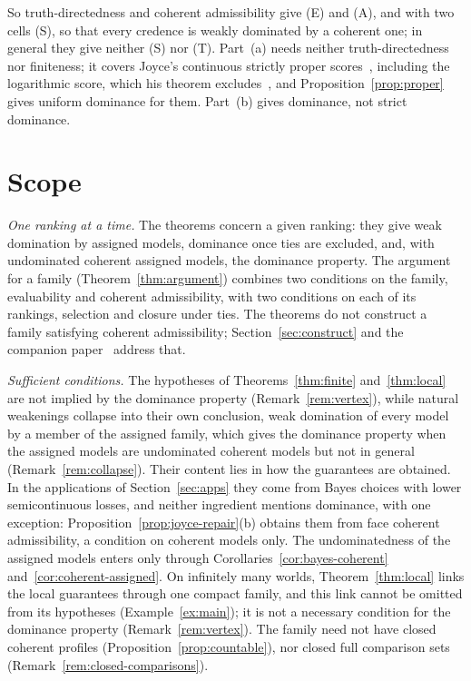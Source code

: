 \documentclass[11pt]{article}
\theoremstyle{definition}
\theoremstyle{remark}
\begin{document}
So truth-directedness and coherent admissibility give (E) and (A), and with two cells (S), so that every credence is weakly dominated by a coherent one; in general they give neither (S) nor (T). Part~(a) needs neither truth-directedness nor finiteness; it covers Joyce's continuous strictly proper scores~\cite[p.~276]{Joyce}, including the logarithmic score, which his theorem excludes~\cite[p.~288]{Joyce}, and Proposition~\ref{prop:proper} gives uniform dominance for them. Part~(b) gives dominance, not strict dominance.

\section{Scope}\label{sec:scope}
\emph{One ranking at a time.} The theorems concern a given ranking: they give weak domination by assigned models, dominance once ties are excluded, and, with undominated coherent assigned models, the dominance property. The argument for a family (Theorem~\ref{thm:argument}) combines two conditions on the family, evaluability and coherent admissibility, with two conditions on each of its rankings, selection and closure under ties. The theorems do not construct a family satisfying coherent admissibility; Section~\ref{sec:construct} and the companion paper~\cite{KCM} address that.

\emph{Sufficient conditions.} The hypotheses of Theorems~\ref{thm:finite} and~\ref{thm:local} are not implied by the dominance property (Remark~\ref{rem:vertex}), while natural weakenings collapse into their own conclusion, weak domination of every model by a member of the assigned family, which gives the dominance property when the assigned models are undominated coherent models but not in general (Remark~\ref{rem:collapse}). Their content lies in how the guarantees are obtained. In the applications of Section~\ref{sec:apps} they come from Bayes choices with lower semicontinuous losses, and neither ingredient mentions dominance, with one exception: Proposition~\ref{prop:joyce-repair}(b) obtains them from face coherent admissibility, a condition on coherent models only. The undominatedness of the assigned models enters only through Corollaries~\ref{cor:bayes-coherent} and~\ref{cor:coherent-assigned}. On infinitely many worlds, Theorem~\ref{thm:local} links the local guarantees through one compact family, and this link cannot be omitted from its hypotheses (Example~\ref{ex:main}); it is not a necessary condition for the dominance property (Remark~\ref{rem:vertex}). The family need not have closed coherent profiles (Proposition~\ref{prop:countable}), nor closed full comparison sets (Remark~\ref{rem:closed-comparisons}).
\end{document}
